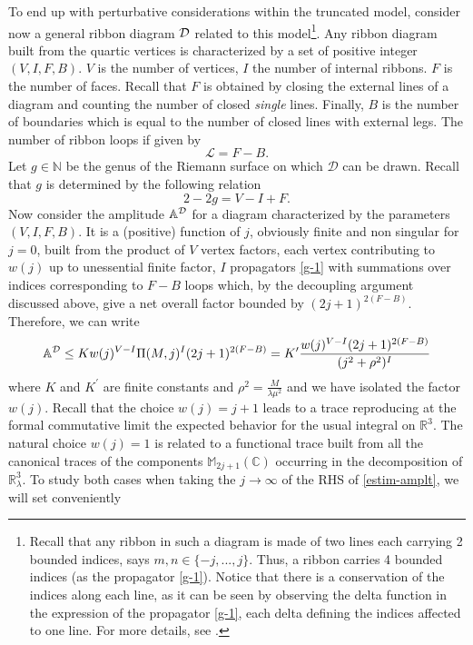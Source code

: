 \documentclass[11pt]{book}
\theoremstyle{break}
\begin{document}
To end up with perturbative considerations within the truncated model, consider now a general ribbon diagram ${\cal{D}}$ related to this model{\footnote{Recall that any ribbon in such a diagram is made of two lines each carrying 2 bounded indices, says $m,n\in\{-j,...,j \}$. Thus, a ribbon carries 4 bounded indices (as the propagator \eqref{g-1}). Notice that there is a conservation of the indices along each line, as it can be seen by observing the delta function in the expression of the propagator \eqref{g-1}, each delta defining the indices affected to one line. For more details, see \cite{vitale_noncommutative_2013}.}}. Any ribbon diagram built from the quartic vertices is characterized by a set of positive integer $(V,I,F,B)$. $V$ is the number of vertices, $I$ the number of internal ribbons. $F$ is the number of faces. Recall that $F$ is obtained by closing the external lines of a diagram and counting the number of closed {\it{single}} lines. Finally, $B$ is the number of boundaries which is equal to the number of closed lines with external legs. The number of ribbon loops if given by
\begin{equation}
\mathcal{L}=F-B \label{loops-number}.
\end{equation}
Let $g\in\mathbb{N}$ be the genus of the Riemann surface on which $\mathcal{D}$ can be drawn. Recall that $g$ is determined by the following relation
\begin{equation}
2-2g=V-I+F \label{euler}.
\end{equation}
Now consider the amplitude ${\mathbb{A}}^{\cal{D}}$ for a diagram characterized by the parameters $(V,I,F,B)$. It is a (positive) function of $j$, obviously finite and non singular for $j=0$, built from the product of $V$ vertex factors, each vertex contributing to $w(j)$ up to unessential finite factor, $I$ propagators \eqref{g-1} with summations over indices corresponding to $F-B$ loops which, by the decoupling argument discussed above, give a net overall factor bounded by $(2j+1)^{2(F-B)}$. Therefore, we can write
\begin{equation}
{\mathbb{A}}^{\cal{D}}\le Kw(j)^{V-I}\Pi(M,j)^{I}(2j+1)^{2(F-B)}=K^\prime\frac{w(j)^{V-I}(2j+1)^{2(F-B)}}{(j^2+\rho^2)^I}\label{estim-amplt}
\end{equation}
where $K$ and $K^\prime$ are finite constants and $\rho^2=\frac{M}{\lambda\mu^2}$ and we have isolated the factor $w(j)$. Recall that the choice $w(j)=j+1$ leads to a trace reproducing at the formal commutative limit the expected behavior for the usual integral on $\mathbb{R}^3$. The natural choice $w(j)=1$ is related to a functional trace built from all the canonical traces of the components $\mathbb{M}_{2j+1}(\mathbb{C})$ occurring in the decomposition of $\mathbb{R}^3_\lambda$. To study both cases when taking the $j\to\infty$ of the RHS of \eqref{estim-amplt}, we will set conveniently
\end{document}
